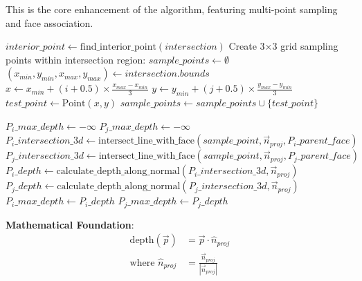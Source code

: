 \documentclass[12pt,a4paper]{article}
\begin{document}
This is the core enhancement of the algorithm, featuring multi-point sampling and face association.

\begin{algorithm}
\caption{Enhanced Depth Analysis}
\begin{algorithmic}[1]
\STATE $interior\_point \leftarrow \text{find\_interior\_point}(intersection)$
\STATE Create 3×3 grid sampling points within intersection region:
\STATE $sample\_points \leftarrow \emptyset$
\STATE $(x_{min}, y_{min}, x_{max}, y_{max}) \leftarrow intersection.bounds$
        \STATE $x \leftarrow x_{min} + (i + 0.5) \times \frac{x_{max} - x_{min}}{3}$
        \STATE $y \leftarrow y_{min} + (j + 0.5) \times \frac{y_{max} - y_{min}}{3}$
        \STATE $test\_point \leftarrow \text{Point}(x, y)$
            \STATE $sample\_points \leftarrow sample\_points \cup \{test\_point\}$
        \ENDIF
    \ENDFOR
\ENDFOR
\end{algorithmic}
\end{algorithm}

\begin{algorithm}
\caption{Farthest Point Detection}
\begin{algorithmic}[1]
\STATE $P_i\_max\_depth \leftarrow -\infty$
\STATE $P_j\_max\_depth \leftarrow -\infty$
    \STATE $P_i\_intersection\_3d \leftarrow \text{intersect\_line\_with\_face}(sample\_point, \vec{n}_{proj}, P_i\_parent\_face)$
    \STATE $P_j\_intersection\_3d \leftarrow \text{intersect\_line\_with\_face}(sample\_point, \vec{n}_{proj}, P_j\_parent\_face)$
    \STATE $P_i\_depth \leftarrow \text{calculate\_depth\_along\_normal}(P_i\_intersection\_3d, \vec{n}_{proj})$
    \STATE $P_j\_depth \leftarrow \text{calculate\_depth\_along\_normal}(P_j\_intersection\_3d, \vec{n}_{proj})$
        \STATE $P_i\_max\_depth \leftarrow P_i\_depth$
    \ENDIF
        \STATE $P_j\_max\_depth \leftarrow P_j\_depth$
    \ENDIF
\ENDFOR
\end{algorithmic}
\end{algorithm}

\textbf{Mathematical Foundation}: 
\begin{align}
\text{depth}(\vec{p}) &= \vec{p} \cdot \hat{n}_{proj} \\
\text{where } \hat{n}_{proj} &= \frac{\vec{n}_{proj}}{|\vec{n}_{proj}|}
\end{align}
\end{document}
